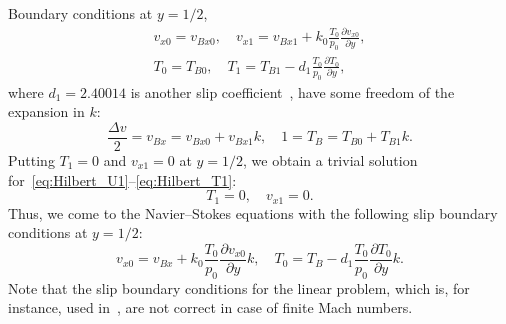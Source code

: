 \documentclass[final]{jfm} %
\newcommand{\pder}[2][]{\frac{\partial#1}{\partial#2}}
\begin{document}
Boundary conditions at \(y=1/2\),
\begin{gather}
    v_{x0} = v_{Bx0}, \quad v_{x1} = v_{Bx1} + k_0 \frac{T_0}{p_0} \pder[v_{x0}]{y}, \label{eq:hilbert_bc_U}\\
    T_0 = T_{B0}, \quad T_1 = T_{B1} - d_1 \frac{T_0}{p_0} \pder[T_0]{y}, \label{eq:hilbert_bc_T}
\end{gather}
where \(d_1 = 2.40014\) is another slip coefficient~\citep{Takata2015},
have some freedom of the expansion in \(k\):
\begin{equation}\label{eq:hilbert_boundary_expansion}
    \frac{\Delta{v}}2 = v_{Bx} = v_{Bx0} + v_{Bx1}k, \quad 1 = T_B = T_{B0} + T_{B1}k.
\end{equation}
Putting \(T_1 = 0\) and \(v_{x1} = 0\) at \(y=1/2\), we obtain a trivial solution
for~\eqref{eq:Hilbert_U1}--\eqref{eq:Hilbert_T1}:
\begin{equation}\label{eq:hilbert_solution1}
    T_1 = 0, \quad v_{x1} = 0.
\end{equation}
Thus, we come to the Navier--Stokes equations with the following slip boundary conditions at \(y=1/2\):
\begin{equation}\label{eq:hilbert_slip_bc}
    v_{x0} = v_{Bx} + k_0 \frac{T_0}{p_0} \pder[v_{x0}]{y} k, \quad
    T_0 = T_B - d_1 \frac{T_0}{p_0} \pder[T_0]{y} k.
\end{equation}
Note that the slip boundary conditions for the linear problem, which is, for instance,
used in~\citet{Sharipov2000}, are not correct in case of finite Mach numbers.
\end{document}
